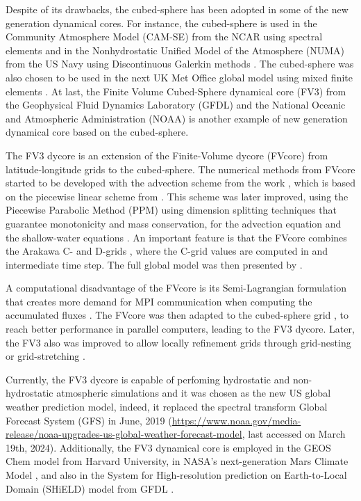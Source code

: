 Despite of its drawbacks, the cubed-sphere has been adopted in some of the new generation
dynamical cores.
For instance, the cubed-sphere is used in the 
Community Atmosphere Model (CAM-SE) from the NCAR using spectral elements \citep{dennis:2012} and in the
Nonhydrostatic Unified Model of the Atmosphere (NUMA) from the US Navy using Discontinuous Galerkin 
methods \citep{giraldo:2013}. The cubed-sphere was also chosen to be used in the next UK Met Office
global model using mixed finite elements \citep{melvin:2022}.
At last, the Finite­ Volume Cubed-Sphere dynamical core (FV3) from the Geophysical Fluid 
Dynamics Laboratory (GFDL) and the National Oceanic and Atmospheric Administration (NOAA)
\citep{putman:2007,harris:2013} is another example
of new generation dynamical core based on the cubed-sphere.

The FV3 dycore is an extension of the Finite-Volume dycore (FVcore)
from latitude-longitude grids to the cubed-sphere.
The numerical methods from FVcore started to be developed with the advection scheme from the work \citet{lin:1994},
which is based on the piecewise linear scheme from \citet{vanleer:1977}. 
This scheme was later improved, using the Piecewise Parabolic Method (PPM) \citep{colella:1984, carpenter:1990}
using dimension splitting techniques that guarantee monotonicity and mass conservation,
for the advection equation \citep{lin:1996} and the shallow-water equations \citep{lin:1997}. 
An important feature is that the FVcore combines the  Arakawa C- and D-grids \citep{arakawa:1977},
where the C-grid values are computed in and intermediate time step. 
The full global model was then presented by \citet{lin:2004}.

A computational disadvantage of the FVcore is its Semi-Lagrangian formulation that creates more demand
for MPI communication when computing the accumulated fluxes \citep{lin:1996}.
The FVcore was then adapted to the cubed-sphere grid \citep{putmanthesis:2007, putman:2007}, 
to reach better performance in parallel computers, leading to the FV3 dycore.
Later, the FV3 also was improved to allow locally refinement grids 
through grid-nesting or grid-stretching \citep{harris:2013}.

Currently, the FV3 dycore is capable of perfoming hydrostatic and non-hydrostatic atmospheric simulations 
and it was chosen as the new US global weather prediction model, indeed, it replaced the spectral transform
Global Forecast System (GFS) in June, 2019
(\url{https://www.noaa.gov/media-release/noaa-upgrades-us-global-weather-forecast-model}, last accessed on March 19th, 2024).
Additionally, the FV3 dynamical core is employed in the GEOS Chem model \citep{martin:2022} from Harvard University, 
in NASA’s next-generation Mars Climate Model \citep{wilson:2022}, 
and also in the System for High-resolution prediction on Earth-to-Local Domain (SHiELD) model from GFDL \citep{harris:2020}.

